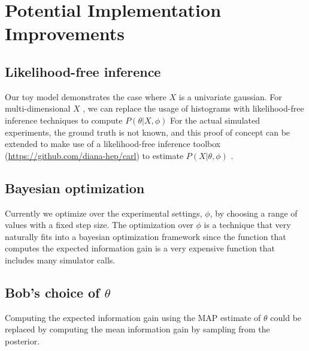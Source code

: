 \documentclass[10pt,journal,compsoc]{IEEEtran}
\begin{document}

\section{Potential Implementation Improvements}
\subsection{Likelihood-free inference}
Our toy model demonstrates the case where $X$ is a univariate gaussian. For multi-dimensional $X$ , we can replace the usage of histograms with likelihood-free inference techniques to compute $P(\theta | X, \phi)$ For the actual simulated experiments, the ground truth is not known, and this proof of concept can be extended to make use of a likelihood-free inference toolbox (\url{https://github.com/diana-hep/carl}) to estimate $P(X | \theta, \phi)$ .
\subsection{Bayesian optimization}
Currently we optimize over the experimental settings, $\phi$, by choosing a range of values with a fixed step size. The optimization over $\phi$ is a technique that very naturally fits into a bayesian optimization framework since the function that computes the expected information gain is a very expensive function that includes many simulator calls. 
\subsection{Bob's choice of $\theta$} 
Computing the expected information gain using the MAP estimate of $\theta$  could be replaced by computing the mean information gain by sampling from the posterior.

 
\end{document}
